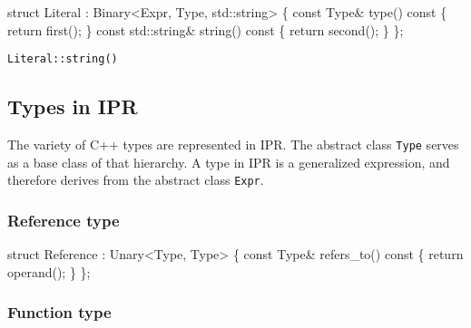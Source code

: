 \documentclass[letter,11pt]{article}
\begin{document}
\begin{Program}
   struct Literal : Binary<Expr, Type, std::string> \{
      const Type& type() const \{ return first(); \}
      const std::string& string() const \{ return second(); \}
   \};
\end{Program}

\begin{description}
\item[\texttt{Literal::string()}] 
\end{description}

\subsection{Types in IPR}
\label{sec:interface:types}

The variety of C++ types are represented in IPR.  The abstract class
\texttt{Type} serves as a base class of that hierarchy.  A type in IPR is a
generalized expression, and therefore derives from the abstract class
\texttt{Expr}.

\subsubsection{Reference type}

\begin{Program}
  struct Reference : Unary<Type, Type> \{
    const Type& refers_to() const \{ return operand(); \}
  \};
\end{Program}


\subsubsection{Function type}
\end{document}
